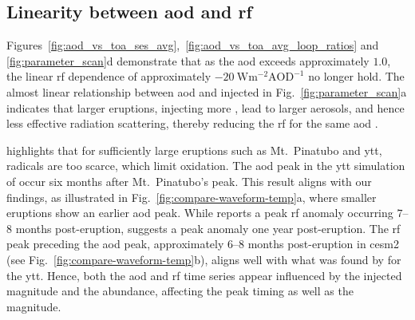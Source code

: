 \documentclass{ametsocV6.1}
\newcommand{\iso}[1][i]{{#1}njected \ce{SO2}}
\begin{document}

\subsection{Linearity between \gls{aod} and \gls{rf}}

Figures~\ref{fig:aod_vs_toa_ses_avg},~\ref{fig:aod_vs_toa_avg_loop_ratios} and
\ref{fig:parameter_scan}d demonstrate that as the \gls{aod} exceeds approximately
\(1.0\), the linear \gls{rf} dependence of approximately
\(\SI{-20}{\watt\metre^{-2}\mathrm{AOD}^{-1}}\) no longer hold. The almost linear
relationship between \gls{aod} and \iso{} in Fig.~\ref{fig:parameter_scan}a indicates
that larger eruptions, injecting more , lead to larger aerosols, and hence less
effective radiation scattering, thereby reducing the \gls{rf} for the same \gls{aod}
\citep{english2013, timmreck2010, timmreck2018}.

\citet{timmreck2010} highlights that for sufficiently large eruptions such as Mt.\
Pinatubo and \gls{ytt},  radicals are too scarce, which limit  oxidation.
The \gls{aod} peak in the \gls{ytt} simulation of \citet{timmreck2010} occur six months
after Mt.\ Pinatubo's peak. This result aligns with our findings, as illustrated in
Fig.~\ref{fig:compare-waveform-temp}a, where smaller eruptions show an earlier \gls{aod}
peak. While \citet{timmreck2010} reports a peak \gls{rf} anomaly occurring \(7\)--\(8\)
months post-eruption, \citet{jones2005} suggests a peak anomaly one year post-eruption.
The \gls{rf} peak preceding the \gls{aod} peak, approximately \(6\)--\(8\) months
post-eruption in \gls{cesm2} (see Fig.~\ref{fig:compare-waveform-temp}b), aligns well
with what was found by \citet{timmreck2010} for the \gls{ytt}. Hence, both the \gls{aod}
and \gls{rf} time series appear influenced by the \iso{} magnitude and the \ce{OH}
abundance, affecting the peak timing as well as the magnitude.
\end{document}
